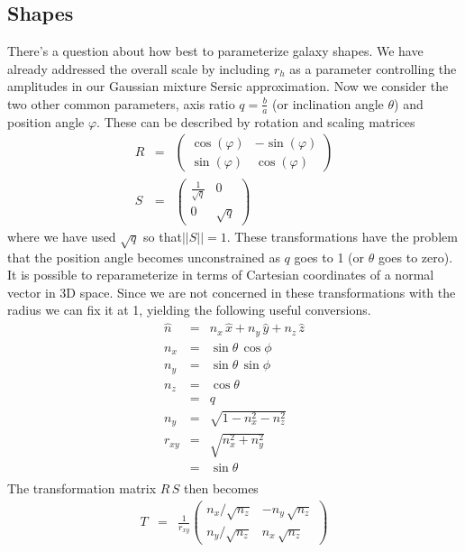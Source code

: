 \documentclass[modern]{aastex6}
\renewcommand{\det}[1]{||{#1}||}
\begin{document}
\subsection{Shapes}
There's a question about how best to parameterize galaxy shapes.
We have already addressed the overall scale by including $r_h$ as a parameter controlling the amplitudes in our Gaussian mixture Sersic approximation.
Now we consider the two other common parameters, axis ratio $q=\frac{b}{a}$ (or inclination angle $\theta$) and position angle $\varphi$.
These can be described by rotation and scaling matrices
\begin{eqnarray}
R & = & \begin{pmatrix} \cos (\varphi) & -\sin(\varphi)\\ \sin(\varphi) & \cos(\varphi)\end{pmatrix} \\
S & = & \begin{pmatrix} \frac{1}{\sqrt{q}} & 0 \\ 0 & \sqrt{q}\end{pmatrix}
\end{eqnarray}
where we have used $\sqrt{q}$ so that$\det{S}=1$.
These transformations have the problem that the position angle becomes unconstrained as $q$ goes to 1 (or $\theta$ goes to zero).
It is possible to reparameterize in terms of Cartesian coordinates of a normal vector in 3D space.
Since we are not concerned in these transformations with the radius we can fix it at 1, yielding the following useful conversions.
\begin{eqnarray}
\hat{n} & = & n_x\, \hat{x} + n_y\, \hat{y} + n_z \, \hat{z} \\
n_x & = & \sin\theta \, \cos\phi \nonumber\\
n_y & = & \sin\theta \, \sin\phi \nonumber\\
n_z & = & \cos\theta \nonumber\\
      & = & q \nonumber\\
n_y & = & \sqrt{1 - n_x^2 - n_z^2} \nonumber\\
r_{xy} & = & \sqrt{n_x^2 + n_y^2} \nonumber\\
       & = & \sin \theta \nonumber\\
\end{eqnarray}
The transformation matrix $R\, S$ then becomes
\begin{eqnarray}
T & = & \frac{1}{r_{xy}}\begin{pmatrix} {n_x/\sqrt{n_z}} &  -n_y \, \sqrt{n_z}\\
                                       {n_y/\sqrt{n_z}} & n_x \, \sqrt{n_z} \end{pmatrix} \\
\end{eqnarray}
\end{document}
